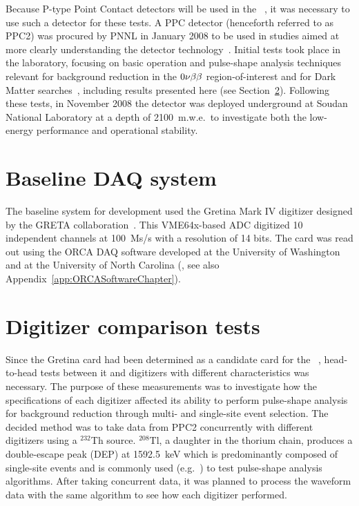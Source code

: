 	Because P-type Point Contact detectors will be used in the \MJ~\minmod, it was necessary to use such a detector for these tests.  A PPC detector (henceforth referred to as PPC2) was procured by PNNL in January 2008 to be used in studies aimed at more clearly understanding the detector technology~\cite{Orr2007}.  Initial tests took place in the laboratory, focusing on basic operation and pulse-shape analysis techniques relevant for background reduction in the $0 \nu \beta \beta$ region-of-interest and for Dark Matter searches~\cite{Orr2008}, including results presented here (see Section~\ref{sec:HeadToHeadCompare}).  Following these tests, in November 2008 the detector was deployed underground at Soudan National Laboratory at a depth of 2100~m.w.e.~to investigate both the low-energy performance and operational stability.
	   
	\section{Baseline DAQ system}

	The baseline system for development used the Gretina Mark IV digitizer designed by the GRETA collaboration~\cite{Anderson:2009p1293}.  This VME64x-based ADC digitized 10 independent channels at 100~Ms/s with a resolution of 14 bits.  The card was read out using the ORCA DAQ software developed at the University of Washington and at the University of North Carolina (\cite{ORCA}, see also Appendix~\ref{app:ORCASoftwareChapter}).  
	
	\section{Digitizer comparison tests}
     	\label{sec:HeadToHeadCompare}
	
	Since the Gretina card had been determined as a candidate card for the \MJ~\minmod, head-to-head tests between it and digitizers with different characteristics was necessary.  The purpose of these measurements was to investigate how the specifications of each digitizer affected its ability to perform pulse-shape analysis for background reduction through multi- and single-site event selection.  The decided method was to take data from PPC2 concurrently with different digitizers using a $^{232}$Th source.  $^{208}$Tl, a daughter in the thorium chain, produces a double-escape peak (DEP) at 1592.5~keV which is predominantly composed of single-site events and is commonly used (e.g.~\cite{Abt2007332,Orrell:2007tt}) to test pulse-shape analysis algorithms.  After taking concurrent data, it was planned to process the waveform data with the same algorithm to see how each digitizer performed.
	
